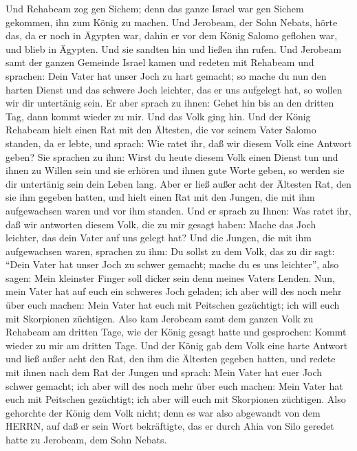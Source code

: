  Und Rehabeam zog gen Sichem; denn das ganze Israel war gen
Sichem gekommen, ihn zum König zu machen.  Und Jerobeam, der
Sohn Nebats, hörte das, da er noch in Ägypten war, dahin er vor dem
König Salomo geflohen war, und blieb in Ägypten.  Und sie
sandten hin und ließen ihn rufen. Und Jerobeam samt der ganzen Gemeinde
Israel kamen und redeten mit Rehabeam und sprachen:  Dein
Vater hat unser Joch zu hart gemacht; so mache du nun den harten Dienst
und das schwere Joch leichter, das er uns aufgelegt hat, so wollen wir
dir untertänig sein.  Er aber sprach zu ihnen: Gehet hin bis
an den dritten Tag, dann kommt wieder zu mir. Und das Volk ging hin.
 Und der König Rehabeam hielt einen Rat mit den Ältesten,
die vor seinem Vater Salomo standen, da er lebte, und sprach: Wie ratet
ihr, daß wir diesem Volk eine Antwort geben?  Sie sprachen
zu ihm: Wirst du heute diesem Volk einen Dienst tun und ihnen zu Willen
sein und sie erhören und ihnen gute Worte geben, so werden sie dir
untertänig sein dein Leben lang.  Aber er ließ außer acht
der Ältesten Rat, den sie ihm gegeben hatten, und hielt einen Rat mit
den Jungen, die mit ihm aufgewachsen waren und vor ihm standen.
 Und er sprach zu Ihnen: Was ratet ihr, daß wir antworten
diesem Volk, die zu mir gesagt haben: Mache das Joch leichter, das dein
Vater auf uns gelegt hat?  Und die Jungen, die mit ihm
aufgewachsen waren, sprachen zu ihm: Du sollst zu dem Volk, das zu dir
sagt: ``Dein Vater hat unser Joch zu schwer gemacht; mache du es uns
leichter'', also sagen: Mein kleinster Finger soll dicker sein denn
meines Vaters Lenden.  Nun, mein Vater hat auf euch ein
schweres Joch geladen; ich aber will des noch mehr über euch machen:
Mein Vater hat euch mit Peitschen gezüchtigt; ich will euch mit
Skorpionen züchtigen.  Also kam Jerobeam samt dem ganzen
Volk zu Rehabeam am dritten Tage, wie der König gesagt hatte und
gesprochen: Kommt wieder zu mir am dritten Tage.  Und der
König gab dem Volk eine harte Antwort und ließ außer acht den Rat, den
ihm die Ältesten gegeben hatten,  und redete mit ihnen nach
dem Rat der Jungen und sprach: Mein Vater hat euer Joch schwer gemacht;
ich aber will des noch mehr über euch machen: Mein Vater hat euch mit
Peitschen gezüchtigt; ich aber will euch mit Skorpionen züchtigen.
 Also gehorchte der König dem Volk nicht; denn es war also
abgewandt von dem HERRN, auf daß er sein Wort bekräftigte, das er durch
Ahia von Silo geredet hatte zu Jerobeam, dem Sohn Nebats. 
